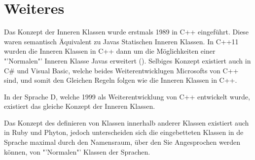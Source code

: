 \section{Weiteres}

Das Konzept der Inneren Klassen wurde erstmals 1989 in C++ eingeführt. Diese waren semantisch Äquivalent zu Javas Statischen Inneren Klassen.
In C++11 wurden die Inneren Klassen in C++ dann um die Möglichkeiten einer "'Normalen"' Inneren Klasse Javas erweitert (\cite{Ellis2007}).
Selbiges Konzept existiert auch in C\# und Visual Basic, welche beides Weiterentwicklugen Microsofts von C++ sind,
 und somit den Gleichen Regeln folgen wie die Inneren Klassen in C++.

In der Sprache D, welche 1999 als Weiterentwicklung von C++ entwickelt wurde, existiert das gleiche Konzept der Inneren Klassen.

Das Konzept des definieren von Klassen innerhalb anderer Klassen existiert auch in Ruby und Phyton,
 jedoch unterscheiden sich die eingebetteten Klassen in de Sprache maximal durch den Namensraum,
 über den Sie Angesprochen werden können, von "'Normalen"' Klassen der Sprachen.
